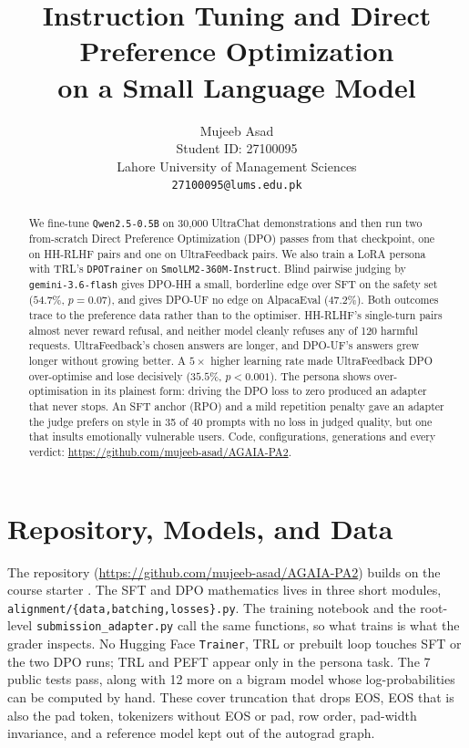 \documentclass{article}
\title{Instruction Tuning and Direct Preference Optimization\\on a Small Language Model}
\author{%
  Mujeeb Asad \\
  Student ID: 27100095 \\
  Lahore University of Management Sciences \\
  \texttt{27100095@lums.edu.pk} \\
}
\begin{document}
\maketitle

\begin{abstract}
We fine-tune \texttt{Qwen2.5-0.5B} on 30{,}000 UltraChat demonstrations and then run two from-scratch Direct
Preference Optimization (DPO) passes from that checkpoint, one on HH-RLHF pairs and one on UltraFeedback pairs. We
also train a LoRA persona with TRL's \texttt{DPOTrainer} on \texttt{SmolLM2-360M-Instruct}. Blind pairwise judging by
\texttt{gemini-3.6-flash} gives DPO-HH a small, borderline edge over SFT on the safety set ($54.7\%$, $p=0.07$), and
gives DPO-UF no edge on AlpacaEval ($47.2\%$). Both outcomes trace to the preference data rather than to the
optimiser. HH-RLHF's single-turn pairs almost never reward refusal, and neither model cleanly refuses any of 120
harmful requests. UltraFeedback's chosen answers are longer, and DPO-UF's answers grew longer without growing better.
A $5\times$ higher learning rate made UltraFeedback DPO over-optimise and lose decisively ($35.5\%$, $p<0.001$). The
persona shows over-optimisation in its plainest form: driving the DPO loss to zero produced an adapter that never
stops. An SFT anchor (RPO) and a mild repetition penalty gave an adapter the judge prefers on style in 35 of 40 prompts
with no loss in judged quality, but one that insults emotionally vulnerable users. Code, configurations, generations
and every verdict: \url{https://github.com/mujeeb-asad/AGAIA-PA2}.
\end{abstract}

\section{Repository, Models, and Data}
\label{sec:data}

The repository (\url{https://github.com/mujeeb-asad/AGAIA-PA2}) builds on the course starter \citep{starter2026}. The
SFT and DPO mathematics lives in three short modules, \texttt{alignment/\{data,batching,losses\}.py}. The training
notebook and the root-level \texttt{submission\_adapter.py} call the same functions, so what trains is what the grader
inspects. No Hugging Face \texttt{Trainer}, TRL or prebuilt loop touches SFT or the two DPO runs; TRL and PEFT
\citep{vonwerra2020trl,mangrulkar2022peft} appear only in the persona task. The 7 public tests pass, along with 12 more
on a bigram model whose log-probabilities can be computed by hand. These cover truncation that drops EOS, EOS that is
also the pad token, tokenizers without EOS or pad, row order, pad-width invariance, and a reference model kept out of
the autograd graph.
\end{document}
